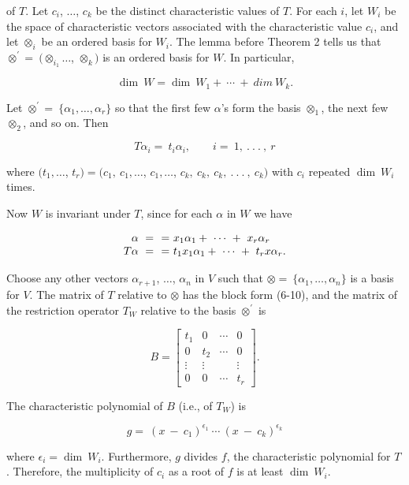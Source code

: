 of \(T\). Let \(c_{i}\), \(\ldots\), \(c_{k}\) be the distinct characteristic values of \(T\). For each \(i\), let \(W_{i}\) be the space of characteristic vectors associated with the characteristic value \(c_{i}\), and let \(\otimes_{i}\) be an ordered basis for \(W_{i}\). The lemma before Theorem 2 tells us that \(\otimes^{\prime}=\ (\otimes_{i_{1}}\ldots\), \(\otimes_{k})\) is an ordered basis for \(W\). In particular,

\[\dim\ W=\dim\ W_{1}+\ \cdots\ +\ dim\ W_{k}.\]

Let \(\otimes^{\prime}=\ \{\alpha_{1},\ldots,\alpha_{r}\}\) so that the first few \(\alpha\)'s form the basis \(\otimes_{1}\), the next few \(\otimes_{2}\), and so on. Then

\[T\alpha_{i}=\ t_{i}\alpha_{i},\qquad i=\ 1,\ .\ .\ .\ ,\ r\]

where \((t_{1},\ldots\), \(t_{r})=(c_{1},\ c_{1},\ldots\), \(c_{1},\ldots\), \(c_{k},\ c_{k},\ c_{k},\ .\ .\ .\ ,\ c_{k})\) with \(c_{i}\) repeated \(\dim\ W_{i}\) times.

Now \(W\) is invariant under \(T\), since for each \(\alpha\) in \(W\) we have

\[\begin{array}{r@{\ =\ }l}\alpha\ =\ &x_{1}\alpha_{1}+\ \cdots\ +\ x_{r}\alpha_{r}\\ T\alpha\ =\ &t_{1}x_{1}\alpha_{1}+\ \cdots\ +\ t_{r}x\alpha_{r}.\end{array}\]

Choose any other vectors \(\alpha_{r+1}\), \(\ldots\), \(\alpha_{n}\) in \(V\) such that \(\otimes=\ \{\alpha_{1},\ldots,\alpha_{n}\}\) is a basis for \(V\). The matrix of \(T\) relative to \(\otimes\) has the block form (6-10), and the matrix of the restriction operator \(T_{W}\) relative to the basis \(\otimes^{\prime}\) is

\[B=\begin{bmatrix}t_{1}&0&\cdots&0\\ 0&t_{2}&\cdots&0\\ \vdots&\vdots&&\vdots\\ 0&0&\cdots&t_{r}\end{bmatrix}.\]

The characteristic polynomial of \(B\) (i.e., of \(T_{W}\)) is

\[g=\ (x\ -\ c_{1})^{\epsilon_{1}}\ \cdots\ (x\ -\ c_{k})^{\epsilon_{k}}\]

where \(\epsilon_{i}=\dim\ W_{i}\). Furthermore, \(g\) divides \(f\), the characteristic polynomial for \(T\). Therefore, the multiplicity of \(c_{i}\) as a root of \(f\) is at least \(\dim\ W_{i}\).

